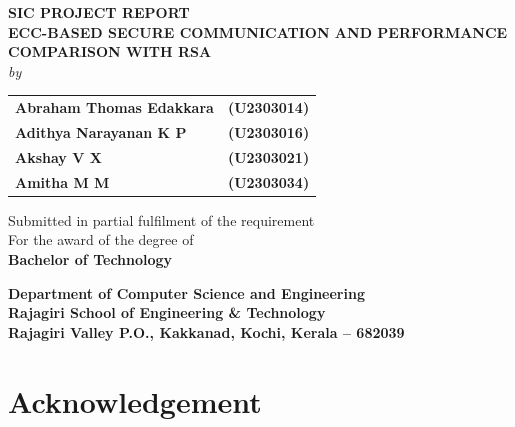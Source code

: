 \documentclass[12pt, a4paper]{report}
\begin{document}
\begin{titlepage}
\centering
\vspace*{0.5cm}

{\fontsize{18}{22}\selectfont \textbf{\textcolor{darkmaroon}{SIC PROJECT REPORT}}}\\[1cm]
{\fontsize{20}{24}\selectfont \textbf{\textcolor{darkmaroon}{ECC-BASED SECURE COMMUNICATION AND PERFORMANCE COMPARISON WITH RSA}}}\\[1.5cm]

{\large \textit{by}}\\[0.8cm]

\begin{tabular}{ll}
  \large\textbf{Abraham Thomas Edakkara} & \large\textbf{(U2303014)} \\[0.25cm]
  \large\textbf{Adithya Narayanan K P}   & \large\textbf{(U2303016)} \\[0.25cm]
  \large\textbf{Akshay V X}              & \large\textbf{(U2303021)} \\[0.25cm]
  \large\textbf{Amitha M M}              & \large\textbf{(U2303034)} \\
\end{tabular}

\vspace{2cm}

{\large Submitted in partial fulfilment of the requirement \\ For the award of the degree of \\ \textbf{Bachelor of Technology}}

\vspace{1.5cm}

{\large \textbf{Department of Computer Science and Engineering}}\\[0.2cm]
{\large \textbf{Rajagiri School of Engineering \& Technology}}\\[0.2cm]
{\large \textbf{Rajagiri Valley P.O., Kakkanad, Kochi, Kerala -- 682039}}

\vfill
\end{titlepage}


\chapter*{Acknowledgement}
\end{document}
